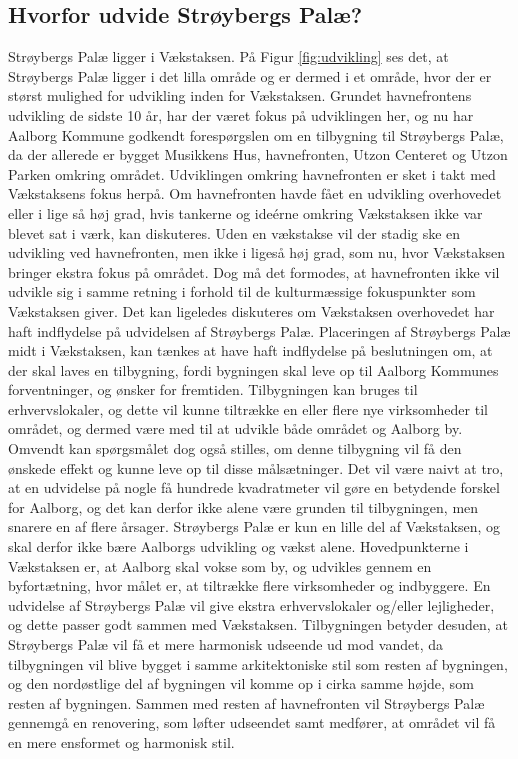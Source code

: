 \subsection{Hvorfor udvide Strøybergs Palæ?}
Strøybergs Palæ ligger i Vækstaksen. På Figur \ref{fig:udvikling} ses det, at Strøybergs Palæ ligger i det lilla område og er dermed i et område, hvor der er størst mulighed for udvikling inden for Vækstaksen. Grundet havnefrontens udvikling de sidste 10 år, har der været fokus på udviklingen her, og nu har Aalborg Kommune godkendt forespørgslen om en tilbygning til Strøybergs Palæ, da der allerede er bygget Musikkens Hus, havnefronten, Utzon Centeret og Utzon Parken omkring området. Udviklingen omkring havnefronten er sket i takt med Vækstaksens fokus herpå. Om havnefronten havde fået en udvikling overhovedet eller i lige så høj grad, hvis tankerne og ideérne omkring Vækstaksen ikke var blevet sat i værk, kan diskuteres. Uden en vækstakse vil der stadig ske en udvikling ved havnefronten, men ikke i ligeså høj grad, som nu, hvor Vækstaksen bringer ekstra fokus på området. Dog må det formodes, at havnefronten ikke vil udvikle sig i samme retning i forhold til de kulturmæssige fokuspunkter som Vækstaksen giver. 
\newline \indent{     }  Det kan ligeledes diskuteres om Vækstaksen overhovedet har haft indflydelse på udvidelsen af Strøybergs Palæ. Placeringen af Strøybergs Palæ midt i Vækstaksen, kan tænkes at have haft indflydelse på beslutningen om, at der skal laves en tilbygning, fordi bygningen skal leve op til Aalborg Kommunes forventninger, og ønsker for fremtiden. Tilbygningen kan bruges til erhvervslokaler, og dette vil kunne tiltrække en eller flere nye virksomheder til området, og dermed være med til at udvikle både området og Aalborg by. Omvendt kan spørgsmålet dog også stilles, om denne tilbygning vil få den ønskede effekt og kunne leve op til disse målsætninger. Det vil være naivt at tro, at en udvidelse på nogle få hundrede kvadratmeter vil gøre en betydende forskel for Aalborg, og det kan derfor ikke alene være grunden til tilbygningen, men snarere en af flere årsager. Strøybergs Palæ er kun en lille del af Vækstaksen, og skal derfor ikke bære Aalborgs udvikling og vækst alene.
\newline \indent{     }  Hovedpunkterne i Vækstaksen er, at Aalborg skal vokse som by, og udvikles gennem en byfortætning, hvor målet er, at tiltrække flere  virksomheder og indbyggere. En udvidelse af Strøybergs Palæ vil give ekstra erhvervslokaler og/eller lejligheder, og dette passer godt sammen med Vækstaksen. Tilbygningen betyder desuden, at Strøybergs Palæ vil få et mere harmonisk udseende ud mod vandet, da tilbygningen vil blive bygget i samme arkitektoniske stil som resten af bygningen, og den nordøstlige del af bygningen vil komme op i cirka samme højde, som resten af bygningen. Sammen med resten af havnefronten vil Strøybergs Palæ gennemgå en renovering, som løfter udseendet samt medfører, at området vil få en mere ensformet og harmonisk stil.
